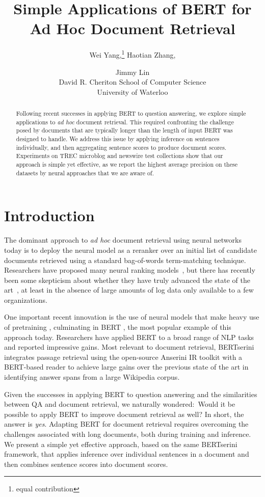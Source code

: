 \documentclass[11pt,a4paper]{article}
\title{Simple Applications of BERT for Ad Hoc Document Retrieval}
\author{Wei Yang,\thanks{\hspace{0.25cm}equal contribution} \hspace{0.1cm} Haotian Zhang,\samethanks \hspace{0.1cm} \and Jimmy Lin\vspace{0.1cm}\\
  David R. Cheriton School of Computer Science \\
  University of Waterloo}
\date{}
\begin{document}
\maketitle
\begin{abstract}
Following recent successes in applying BERT to question answering, we explore simple applications to {\it ad hoc} document retrieval.
This required confronting the challenge posed by documents that are typically longer than the length of input BERT was designed to handle.
We address this issue by applying inference on sentences individually, and then aggregating sentence scores to produce document scores.
Experiments on TREC microblog and newswire test collections show that our approach is simple yet effective, as we report the highest average precision on these datasets by neural approaches that we are aware of.
\end{abstract}

\section{Introduction}

The dominant approach to {\it ad hoc} document retrieval using neural networks today is to deploy the neural model as a reranker over an initial list of candidate documents retrieved using a standard bag-of-words term-matching technique.
Researchers have proposed many neural ranking models~\cite{MitraBhaskar_Craswell_2019}, but there has recently been some skepticism about whether they have truly advanced the state of the art~\cite{Lin_SIGIRForum2018}, at least in the absence of large amounts of log data only available to a few organizations.

One important recent innovation is the use of neural models that make heavy use of pretraining \cite{N18-1202,radford2018improving}, culminating in BERT \cite{devlin2018bert}, the most popular example of this approach today.
Researchers have applied BERT to a broad range of NLP tasks and reported impressive gains.
Most relevant to document retrieval, BERTserini~\cite{Yang_etal_arXiv2019} integrates passage retrieval using the open-source Anserini IR toolkit with a BERT-based reader to achieve large gains over the previous state of the art in identifying answer spans from a large Wikipedia corpus.

Given the successes in applying BERT to question answering and the similarities between QA and document retrieval, we naturally wondered:\ Would it be possible to apply BERT to improve document retrieval as well?
In short, the answer is {\it yes}.
Adapting BERT for document retrieval requires overcoming the challenges associated with long documents, both during training and inference.
We present a simple yet effective approach, based on the same BERTserini framework, that applies inference over individual sentences in a document and then combines sentence scores into document scores.
\end{document}

